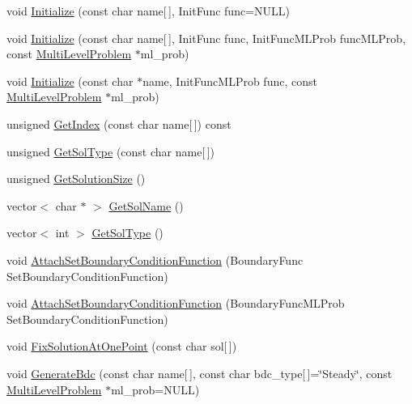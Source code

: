 \begin{DoxyCompactItemize}
void \mbox{\hyperlink{classfemus_1_1_multi_level_solution_a396c250390464f543506ab4ccfd41b3b}{Initialize}} (const char name\mbox{[}$\,$\mbox{]}, Init\+Func func=N\+U\+LL)
\item 
void \mbox{\hyperlink{classfemus_1_1_multi_level_solution_a453827731acbe90751de895decd54657}{Initialize}} (const char name\mbox{[}$\,$\mbox{]}, Init\+Func func, Init\+Func\+M\+L\+Prob func\+M\+L\+Prob, const \mbox{\hyperlink{classfemus_1_1_multi_level_problem}{Multi\+Level\+Problem}} $\ast$ml\+\_\+prob)
\item 
void \mbox{\hyperlink{classfemus_1_1_multi_level_solution_aab58bc824c4e1b0cff1ddae73cba678a}{Initialize}} (const char $\ast$name, Init\+Func\+M\+L\+Prob func, const \mbox{\hyperlink{classfemus_1_1_multi_level_problem}{Multi\+Level\+Problem}} $\ast$ml\+\_\+prob)
\item 
unsigned \mbox{\hyperlink{classfemus_1_1_multi_level_solution_a0c3d81a9146a8e96552da43955f0c7ae}{Get\+Index}} (const char name\mbox{[}$\,$\mbox{]}) const
\item 
unsigned \mbox{\hyperlink{classfemus_1_1_multi_level_solution_a829d506923c3381cc47851e4e45062a7}{Get\+Sol\+Type}} (const char name\mbox{[}$\,$\mbox{]})
\item 
unsigned \mbox{\hyperlink{classfemus_1_1_multi_level_solution_ac54b6f8dfcea29b49969978b9be2068c}{Get\+Solution\+Size}} ()
\item 
vector$<$ char $\ast$ $>$ \mbox{\hyperlink{classfemus_1_1_multi_level_solution_ad0212c08f3d71d4691e9b129fc53d0fb}{Get\+Sol\+Name}} ()
\item 
vector$<$ int $>$ \mbox{\hyperlink{classfemus_1_1_multi_level_solution_af45613cec7257c9fb30feaa73df75aac}{Get\+Sol\+Type}} ()
\item 
void \mbox{\hyperlink{classfemus_1_1_multi_level_solution_abef48eba2d16ef9fba42154e1703cd39}{Attach\+Set\+Boundary\+Condition\+Function}} (Boundary\+Func Set\+Boundary\+Condition\+Function)
\item 
void \mbox{\hyperlink{classfemus_1_1_multi_level_solution_a9ef26adaa5c62a4d565d81f704cacf72}{Attach\+Set\+Boundary\+Condition\+Function}} (Boundary\+Func\+M\+L\+Prob Set\+Boundary\+Condition\+Function)
\item 
void \mbox{\hyperlink{classfemus_1_1_multi_level_solution_a4d868cc8db5f7918e2bc64492313f029}{Fix\+Solution\+At\+One\+Point}} (const char sol\mbox{[}$\,$\mbox{]})
\item 
void \mbox{\hyperlink{classfemus_1_1_multi_level_solution_a9a4e6424cf569942496cde740e8602d1}{Generate\+Bdc}} (const char name\mbox{[}$\,$\mbox{]}, const char bdc\+\_\+type\mbox{[}$\,$\mbox{]}=\char`\"{}Steady\char`\"{}, const \mbox{\hyperlink{classfemus_1_1_multi_level_problem}{Multi\+Level\+Problem}} $\ast$ml\+\_\+prob=N\+U\+LL)

\end{DoxyCompactItemize}
